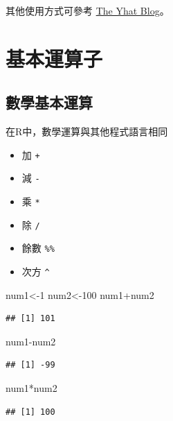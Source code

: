 \documentclass[]{book}
\newenvironment{Shaded}{\begin{snugshade}}{\end{snugshade}}
\newcommand{\DecValTok}[1]{\textcolor[rgb]{0.00,0.00,0.81}{{#1}}}
\newcommand{\NormalTok}[1]{{#1}}
\providecommand{\tightlist}{%
  \setlength{\itemsep}{0pt}\setlength{\parskip}{0pt}}
\theoremstyle{definition}
\theoremstyle{definition}
\theoremstyle{remark}
\begin{document}
其他使用方式可參考
\href{http://blog.yhat.com/static/pdf/R_date_cheat_sheet.pdf}{The Yhat
Blog}。

\section{基本運算子}

\subsection{數學基本運算}

在R中，數學運算與其他程式語言相同

\begin{itemize}
\tightlist
\item
  加 \texttt{+}
\item
  減 \texttt{-}
\item
  乘 \texttt{*}
\item
  除 \texttt{/}
\item
  餘數 \texttt{\%\%}
\item
  次方 \texttt{\^{}}
\end{itemize}

\begin{Shaded}
\begin{Highlighting}[]
\NormalTok{num1<-}\DecValTok{1}
\NormalTok{num2<-}\DecValTok{100}
\NormalTok{num1+num2}
\end{Highlighting}
\end{Shaded}

\begin{verbatim}
## [1] 101
\end{verbatim}

\begin{Shaded}
\begin{Highlighting}[]
\NormalTok{num1-num2}
\end{Highlighting}
\end{Shaded}

\begin{verbatim}
## [1] -99
\end{verbatim}

\begin{Shaded}
\begin{Highlighting}[]
\NormalTok{num1*num2}
\end{Highlighting}
\end{Shaded}

\begin{verbatim}
## [1] 100
\end{verbatim}
\end{document}
